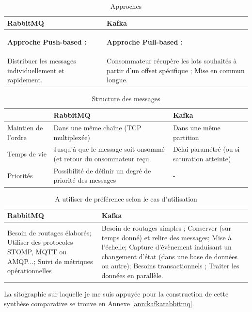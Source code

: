 \documentclass{article}
\begin{document}
			\medskip
			\begin{table}[hp]
				\begin{tabular}{|p{7.5cm}|p{7.5cm}|}
				\hline
				\rowcolor{lightgray} RabbitMQ & Kafka\\\hline
				\begin{center} \textbf{Approche Push-based :}\end{center} & \begin{center} \textbf{Approche Pull-based :}\end{center}\\\hline
				Distribuer les messages individuellement et rapidement. & Consommateur récupère les lots souhaités à partir d’un offset spécifique ; Mise en commun longue.\\\hline
				\end{tabular}
				\caption{Approches}
				\label{tab:comparatifapp}
			\end{table}
			\medskip
			\begin{table}[hp]
				\begin{tabular}{|p{3cm}|p{6cm}|p{6cm}|}
					\hline
					\rowcolor{lightgray} & RabbitMQ & Kafka\\\hline
					Maintien de l'ordre & Dans une même chaîne (TCP multiplexée) & Dans une même partition\\\hline
					Temps de vie & Jusqu’à que le message soit onsommé (et retour du onsommateur reçu & Délai paramétré (ou si saturation atteinte)\\\hline
					Priorités & Possibilité de définir un degré de priorité des messages & - \\\hline
				\end{tabular}
				\caption{Structure des messages}
				\label{tab:comparatifmess}
			\end{table}
			\medskip
			\begin{table}[hp]
				\begin{tabular}{|p{7.5cm}|p{7.5cm}|}
				\hline
				\rowcolor{lightgray} RabbitMQ & Kafka\\\hline
				Besoin de routages élaborés; Utiliser des protocoles STOMP, MQTT ou AMQP...; Suivi de métriques opérationnelles & Besoin de routages simples ; Conserver (sur temps donné) et relire des messages; Mise à l’échelle; Capture d’évènement induisant un changement d’état (dans une base de données ou autre); Besoins transactionnels ; Traiter les données en parallèle.\\\hline
				\end{tabular}
				\caption{A utiliser de préférence selon le cas d'utilisation}
				\label{tab:comparatifpref}
			\end{table}
			La sitographie sur laquelle je me suis appuyée pour la construction de cette synthèse comparative se trouve en Annexe \ref{ann:kafkarabbitmq}.
\end{document}
